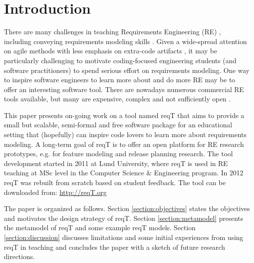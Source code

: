 \documentclass[a4paper]{llncs}
\begin{document}
\section{Introduction}
There are many challenges in teaching Requirements Engineering (RE) \cite{Memon2010, Regev2011}, including  conveying requirements modeling skills \cite{Callele2006}. Given a wide-spread attention on agile methods with less emphasis on extra-code artifacts \cite{Ramesh2010}, it may be particularly challenging to motivate coding-focused engineering students (and software practitioners) to spend serious effort on requirements modeling. One way to inspire software engineers to learn more about and do more RE may be to offer an interesting software tool. There are nowadays numerous commercial RE tools available, but many are expensive, complex and not sufficiently open  \cite{Carillo2011}.  

This paper presents on-going work on a tool named reqT that aims to provide a small but scalable, semi-formal and free software package for an educational setting that (hopefully) can inspire code lovers to learn more about requirements modeling. A long-term goal of reqT is to offer an open platform for RE research prototypes, e.g. for feature modeling and release planning research. The tool development started in 2011 at Lund University, where reqT is used in RE teaching at MSc level in the Computer Science \& Engineering program. In 2012 reqT was rebuilt from scratch based on student feedback. The tool can be downloaded from: \url{http://reqT.org} 

The paper is organized as follows. Section \ref{section:objectives} states the objectives and motivates the design strategy of reqT. Section \ref{section:metamodel} presents the metamodel of reqT and some example reqT models. Section \ref{section:discussion} discusses limitations and some initial experiences from using reqT in teaching and concludes the paper with a sketch of future research directions.
\end{document}
